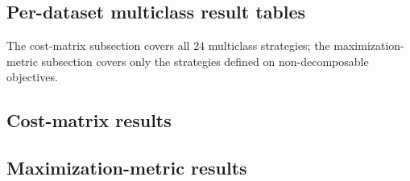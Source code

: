 \documentclass[a4paper,12pt,twoside,brazilian,english]{article}
\begin{document}
\begin{landscape}















\section{Per-dataset multiclass result tables}\label{app:result-tables-multiclass}

The cost-matrix subsection covers all $24$ multiclass strategies; the
maximization-metric subsection covers only the strategies defined on
non-decomposable objectives.

\subsection{Cost-matrix results}













\subsection{Maximization-metric results}














\end{landscape}
\end{document}
